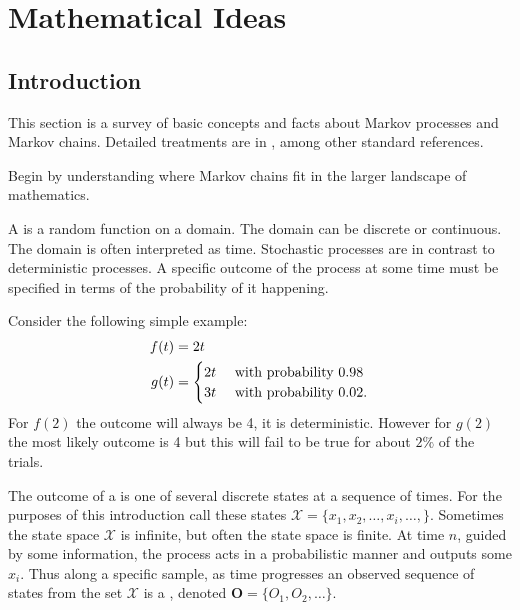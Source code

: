 \documentclass[12pt]{article}
\begin{document}
\hr

\section*{Mathematical Ideas}

\subsection*{Introduction}

This section is a survey of basic concepts and facts about Markov
processes and Markov chains.  Detailed treatments are in
\cite{durrett09, grinstead97, arlin75, kemeny74, kemeny60, levin09,
ross06, stirzaker05-stoch-proces-model}, among other standard
references.

Begin by understanding where Markov chains fit in the larger landscape
of mathematics.

\begin{definition}
    A  is%
    a random function on a domain.  The domain can be discrete or
    continuous.  The domain is often interpreted as time.  Stochastic processes
    are in contrast to deterministic processes.  A specific outcome of
    the process at some time must be specified in terms of the
    probability of it happening.
\end{definition}

Consider the following simple example:
\begin{align*}
    f(t) &= 2t \\
    g(t) &=
    \begin{cases}
        2t & \text{ with probability \( 0.98 \) }\\
        3t & \text{ with probability \( 0.02 \)}.
    \end{cases}
\end{align*}
For \( f(2) \) the outcome will always be 4, it is deterministic.
However for \( g(2) \) the most likely outcome is 4 but this will fail
to be true for about \( 2\% \) of the trials.

\begin{definition}
    The outcome of a  is one of several discrete states at a sequence of times.%
    For the purposes of this introduction call these states \( \mathcal{X}=\{x_1,x_2,\ldots,x_i,
    \ldots, \} \).  Sometimes the state space \( \mathcal{X} \) is
    infinite, but often the state space is finite.  At time \( n \),
    guided by some information, the process acts in a probabilistic
    manner and outputs some \( x_i \).  Thus along a specific sample, as
    time progresses an observed sequence of states from the set \(
    \mathcal{X} \) is a , denoted \( \mathbf{O} = \{O_1,O_2,\ldots\}
    \).
\end{definition}
\end{document}
